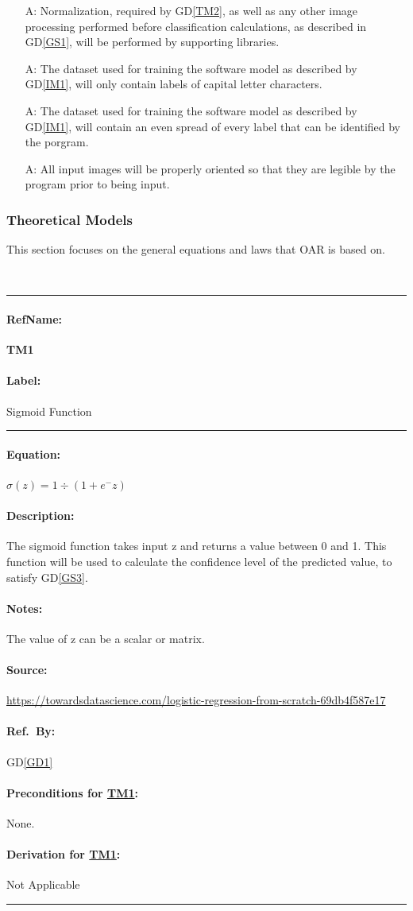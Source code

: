 \documentclass[12pt]{article}
\newcommand{\dref}[1]{GD\ref{#1}}
\newcounter{assumpnum} %
\newcommand{\deftheory}[9][Not Applicable]
{
\newpage
\noindent \rule{\textwidth}{0.5mm}

\paragraph{RefName: } \textbf{#2} \phantomsection 
\label{#2}

\paragraph{Label:} #3

\noindent \rule{\textwidth}{0.5mm}

\paragraph{Equation:}

#4

\paragraph{Description:}

#5

\paragraph{Notes:}

#6

\paragraph{Source:}

#7

\paragraph{Ref.\ By:}

#8

\paragraph{Preconditions for \hyperref[#2]{#2}:}
\label{#2_precond}

#9

\paragraph{Derivation for \hyperref[#2]{#2}:}
\label{#2_deriv}

#1

\noindent \rule{\textwidth}{0.5mm}

}
\begin{document}
\begin{itemize}

\item[A\refstepcounter{assumpnum}\theassumpnum \label{A_meaningfulLabel}:] Normalization, required by \dref{TM2}, as 
well as any other image processing performed before classification calculations, as described in \dref{GS1}, 
will be performed by supporting libraries.
\item[A\refstepcounter{assumpnum}\theassumpnum \label{A_meaningfulLabel}:] The dataset used for training the software model
as described by \dref{IM1}, will only contain labels of capital letter characters.
\item[A\refstepcounter{assumpnum}\theassumpnum \label{A_meaningfulLabel}:] The dataset used for training the software model
as described by \dref{IM1}, will contain an even spread of every label that can be identified by the porgram.
\item[A\refstepcounter{assumpnum}\theassumpnum \label{A_meaningfulLabel}:] All input images will be properly oriented so that 
they are legible by the program prior to being input.

\end{itemize}

\subsubsection{Theoretical Models}\label{sec_theoretical}

This section focuses on the general equations and laws that OAR is based
on.  

~\newline

\noindent
\deftheory
{TM1}
{Sigmoid Function}
{
  $ \sigma(z) = 1 \div (1 + e^-z) $
}
{
The sigmoid function takes input z and returns a value between 0 and 1. This function will be used to calculate
the confidence level of the predicted value, to satisfy \dref{GS3}.

}
{
The value of z can be a scalar or matrix.
}
{
  \url{https://towardsdatascience.com/logistic-regression-from-scratch-69db4f587e17}
}
{
\dref{GD1}
}
{
None.
}
{}

~\newline
\end{document}
